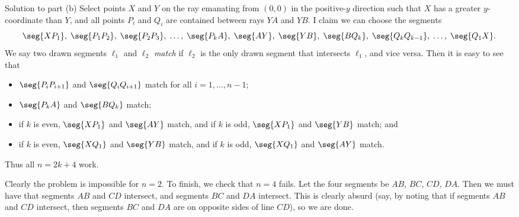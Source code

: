 \begin{customenv}{Solution to part (b)}
    Select points $X$ and $Y$ on the ray emanating from $(0,0)$ in the positive-$y$ direction such that $X$ has a greater $y$-coordinate than $Y$, and all points $P_i$ and $Q_i$ are contained between rays $YA$ and $YB$. I claim we can choose the segments \[\seg{XP_1},\;\seg{P_1P_2},\;\seg{P_2P_3},\;\ldots,\;\seg{P_kA},\;\seg{AY},\;\seg{YB},\;\seg{BQ_k},\;\seg{Q_kQ_{k-1}},\;\ldots,\;\seg{Q_1X}.\]
    We say two drawn segments $\ell_1$ and $\ell_2$ \emph{match} if $\ell_2$ is the only drawn segment that intersects $\ell_1$, and vice versa. Then it is easy to see that
    \begin{itemize}[itemsep=0em]
        \item $\seg{P_iP_{i+1}}$ and $\seg{Q_iQ_{i+1}}$ match for all $i=1,\ldots,n-1$;
        \item $\seg{P_kA}$ and $\seg{BQ_k}$ match;
        \item if $k$ is even, $\seg{XP_1}$ and $\seg{AY}$ match, and if $k$ is odd, $\seg{XP_1}$ and $\seg{YB}$ match; and
        \item if $k$ is even, $\seg{XQ_1}$ and $\seg{YB}$ match, and if $k$ is odd, $\seg{XQ_1}$ and $\seg{AY}$ match.
    \end{itemize}
    Thus all $n=2k+4$ work.

    Clearly the problem is impossible for $n=2$. To finish, we check that $n=4$ fails. Let the four segments be $AB$, $BC$, $CD$, $DA$. Then we must have that segments $AB$ and $CD$ intersect, and segments $BC$ and $DA$ intersect. This is clearly absurd (say, by noting that if segments $AB$ and $CD$ intersect, then segments $BC$ and $DA$ are on opposite sides of line $CD$), so we are done.
\end{customenv}

